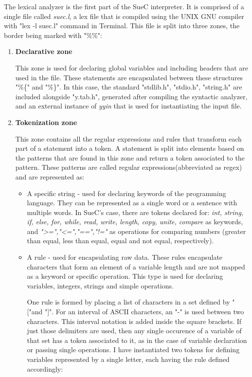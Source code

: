 \documentclass[12pt,a4paper,twoside]{report}
\begin{document}
The lexical analyzer is the first part of the SueC interpreter. It is comprised of a single file called \textit{suec.l}, a lex file that is compiled using the UNIX GNU compiler with "lex -l suec.l" command in Terminal. This file is split into three zones, the border being marked with "\%\%":
\begin{enumerate}
	\item \textbf{Declarative zone}
	
	This zone is used for declaring global variables and including headers that are used in the file. These statements are encapsulated between these structures "\%\{" and "\%\}". In this case, the standard "stdlib.h", "stdio.h", "string.h" are included alongside "y.tab.h", generated after compiling the syntactic analyzer, and an external instance of \textit{yyin} that is used for instantiating the input file.
	
	\item \textbf{Tokenization zone}
	
	This zone contains all the regular expressions and rules that transform each part of a statement into a token. A statement is split into elements based on the patterns that are found in this zone and return a token associated to the pattern.
	These patterns are called regular expressions(abbreviated as regex) and are represented as:
	\begin{itemize}
		\item A specific string - used for declaring keywords of the programming language. They can be represented as a single word or a sentence with multiple words. In SueC's case, there are tokens declared for: \textit{int, string, if, else, for, while, read, write, length, copy, unite, compare} as keywords, and \textit{">=","<=","==","!="} as operations for comparing numbers (greater than equal, less than equal, equal and not equal, respectively).
		\item A rule - used for encapsulating raw data. These rules encapsulate characters that form an element of a variable length and are not mapped as a keyword or specific operation. This type is used for declaring variables, integers, strings and simple operations. 
		
		One rule is formed by placing a list of characters in a set defined by "["and "]". For an interval of ASCII characters, an "-" is used between two characters. This interval notation is added inside the square brackets. If just those delimiters are used, then any single occurence of a variable of that set has a token associated to it, as in the case of variable declaration or passing single operations. I have instantiated two tokens for defining variables represented by a single letter, each having the rule defined accordingly:
		

\end{itemize}
\end{enumerate}
\end{document}

